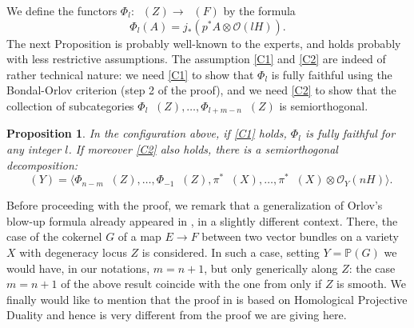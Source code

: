 \documentclass[JEP,XML,SOM,Unicode,NoEqCountersInSection]{cedram}
\let\mathcal\mathscr
\theoremstyle{plain}
\newtheorem{prop}[theorem]{Proposition}
\theoremstyle{definition}
\newcommand{\cat}[1]{\mathsf{#1}}
\newcommand{\sod}[1]{\langle #1 \rangle}
\DeclareMathOperator{\Db}{{\cat{D}^{\mathrm{b}}}}
\newcommand{\PP}{\mathbb{P}}
\newcommand{\sheaf}[1]{\mathcal{#1}}
\newcommand{\ko}{\sheaf{O}}\let\OO\ko\let\cO\ko
\begin{document}
We define the functors $\Phi_l:\Db(Z) \to \Db(F)$ by the formula
\[
\Phi_l(A)= j_* (p^* A \otimes \ko(lH)).
\]
The next Proposition is probably well-known to the experts, and holds probably with less
restrictive assumptions. The assumption \eqref{C1} and \eqref{C2} are indeed of rather technical nature:
we need \eqref{C1} to show that $\Phi_l$ is fully faithful using the Bondal-Orlov
criterion (step 2 of the proof), and we need \eqref{C2} to show that the collection of subcategories
$\Phi_l \Db(Z),\ldots,\Phi_{l+m-n}\Db(Z)$ is semiorthogonal.\enlargethispage{\baselineskip}%

\begin{prop}\label{prop:main-sod}
In the configuration above, if \eqref{C1} holds, $\Phi_l$ is fully faithful for any integer $l$.
If moreover \eqref{C2} also holds, there is a semiorthogonal decomposition:
\[
\Db(Y)=\sod{\Phi_{n-m}\Db(Z),\ldots,\Phi_{-1}\Db(Z),\pi^*\Db(X),\ldots,\pi^*\Db(X)\otimes \ko_Y(nH)}.
\]
\end{prop}

Before proceeding with the proof, we remark that a generalization of Orlov's
blow-up formula already appeared in \cite{Jiang-Leung}, in a slightly different context. There, the
case of the cokernel $G$ of a map $E \to F$ between two vector bundles on a variety $X$ with degeneracy locus $Z$
is considered. In such a case, setting $Y=\PP(G)$ we would have, in our notations, $m=n+1$, but only generically
along $Z$: the case $m=n+1$ of the above result coincide with the one from \cite{Jiang-Leung}
only if $Z$ is smooth. We finally would like to mention that the proof in \cite{Jiang-Leung} is based
on Homological Projective Duality and hence is very different from the proof we are giving here.
\end{document}
